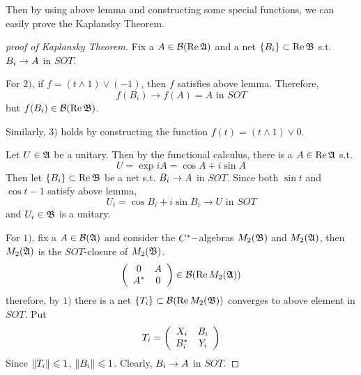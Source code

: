 \documentclass[a4paper,11pt]{report}
\begin{document}
Then by using above lemma and constructing some special functions, we can easily prove the Kaplansky Theorem.

\begin{proof}[proof of Kaplansky Theorem]
	Fix a $A \in \mathcal{B}(\operatorname{Re}{\mathfrak{A}})$ and a net $\{B_i\} \subset \operatorname{Re}{\mathfrak{B}}$ s.t. $B_i \rightarrow A$ in $SOT$.
	\item For $2)$, if $f = (t \wedge 1) \vee (-1)$, then $f$ satisfies above lemma. Therefore,
	\begin{equation*}
		f(B_i) \longrightarrow f(A) =  A \text{ in } SOT
	\end{equation*}
	but $f(B_i) \in \mathcal{B}(\operatorname{Re}{\mathfrak{B}})$.
	\item Similarly, $3)$ holds by constructing the function $f(t) = (t \wedge 1) \vee 0$.
	\item Let $U \in \mathfrak{A}$ be a unitary. Then by the functional calculus, there is a $A \in \operatorname{Re}{\mathfrak{A}}$ s.t.
	\begin{equation*}
		U = \exp{i A} = \cos{A} + i \sin{A}
	\end{equation*}
	Then let $\{B_i\} \subset \operatorname{Re}{\mathfrak{B}}$ be a net s.t. $B_i \rightarrow A$ in $SOT$. Since both $\sin{t}$ and $\cos{t} - 1$  satisfy above lemma, 
	\begin{equation*}
		U_i =  \cos{B_i} + i \sin{B_i} \longrightarrow U \text{ in } SOT
	\end{equation*}
	and $U_i \in \mathfrak{B}$ is a unitary.
	\item For $1)$, fix a $A \in \mathcal{B}(\mathfrak{A})$ and consider the $C^{*}-$algebras $M_2(\mathfrak{B})$ and $M_2(\mathfrak{A})$, then $M_2(\mathfrak{A})$ is the $SOT$-closure of $M_2(\mathfrak{B})$.
	\begin{equation*}
		\left(
			\begin{array}{cc}
				0 & A \\
				A^{*} & 0
			\end{array}
		\right)
		\in \mathcal{B}(\operatorname{Re}{M_2(\mathfrak{A})})
	\end{equation*}
	therefore, by $1)$ there is a net $\{T_i\} \subset \mathcal{B}(\operatorname{Re}{M_2(\mathfrak{B})})$ converges to above element in $SOT$. Put
	\begin{equation*}
		T_i = \left(
			\begin{array}{cc}
				X_i & B_i \\
				B^{*}_i & Y_i
			\end{array}
		\right)
	\end{equation*}
	Since $\left\lVert T_i\right\lVert \leqslant 1$, $\left\lVert B_i\right\lVert \leqslant 1$. Clearly, $B_i \rightarrow A$  in $SOT$.
\end{proof}
\end{document}
